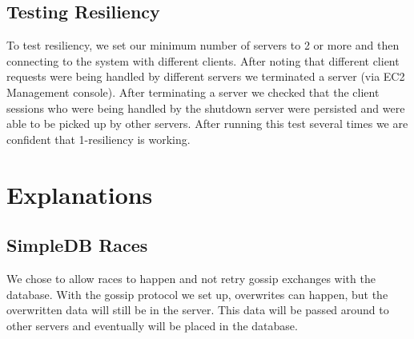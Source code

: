 \documentclass[11pt,letterpaper]{article}
\begin{document}
\subsection{Testing Resiliency}
To test resiliency, we set our minimum number of servers to 2 or more and then connecting to the system with different clients. After noting that different client requests were being handled by different servers we terminated a server (via EC2 Management console). After terminating a server we checked that the client sessions who were being handled by the shutdown server were persisted and were able to be picked up by other servers. After running this test several times we are confident that 1-resiliency is working.

\section{Explanations}

\subsection{SimpleDB Races}
We chose to allow races to happen and not retry gossip exchanges with the database. With the gossip protocol we set up, overwrites can happen, but the overwritten data will still be in the server. This data will be passed around to other servers and eventually will be placed in the database.
\end{document}

